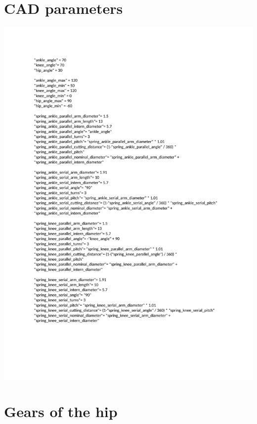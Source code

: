 \begin{appendices}
    \section{CAD parameters}
    \label{app:cad_parameters}
        \includegraphics[width=195mm]{chapters/cha_appendices/cad_parameters}

    \section{Gears of the hip}
    \label{app:hip_gears}


\end{appendices}
